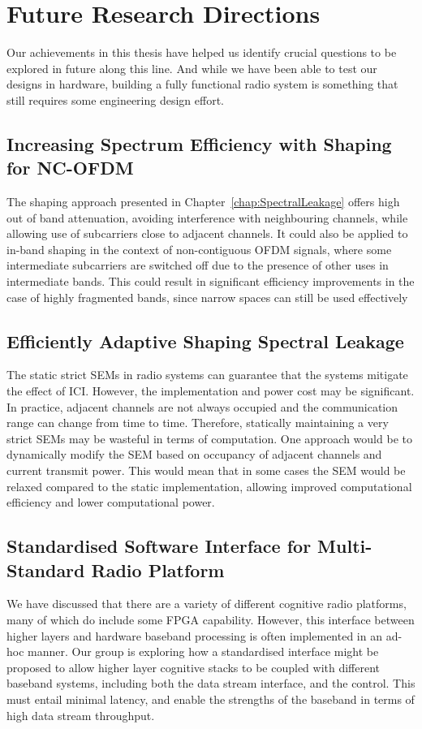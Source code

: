 \section{Future Research Directions}

Our achievements in this thesis have helped us identify crucial questions to be explored in future along this line. And while we have been able to test our designs in hardware, building a fully functional radio system is something that still requires some engineering design effort.

\subsection{Increasing Spectrum Efficiency with Shaping for NC-OFDM}
The shaping approach presented in Chapter~\ref{chap:SpectralLeakage} offers high out of band attenuation, avoiding interference with neighbouring channels, while allowing use of subcarriers close to adjacent channels.
It could also be applied to in-band shaping in the context of non-contiguous OFDM signals, where some intermediate subcarriers are switched off due to the presence of other uses in intermediate bands.
This could result in significant efficiency improvements in the case of highly fragmented bands, since narrow spaces can still be used effectively

\subsection{Efficiently Adaptive Shaping Spectral Leakage}
The static strict SEMs in radio systems can guarantee that the systems mitigate the effect of ICI. However, the implementation and power cost may be significant.
In practice, adjacent channels are not always occupied and the communication range can change from time to time. Therefore, statically maintaining a very strict SEMs may be wasteful in terms of computation.
One approach would be to dynamically modify the SEM based on occupancy of adjacent channels and current transmit power.
This would mean that in some cases the SEM would be relaxed compared to the static implementation, allowing improved computational efficiency and lower computational power.

\subsection{Standardised Software Interface for Multi-Standard Radio Platform}
We have discussed that there are a variety of different cognitive radio platforms, many of which do include some FPGA capability. However, this interface between higher layers and hardware baseband processing is often implemented in an ad-hoc manner. Our group is exploring how a standardised interface might be proposed to allow higher layer cognitive stacks to be coupled with different baseband systems, including both the data stream interface, and the control. This must entail minimal latency, and enable the strengths of the baseband in terms of high data stream throughput.

